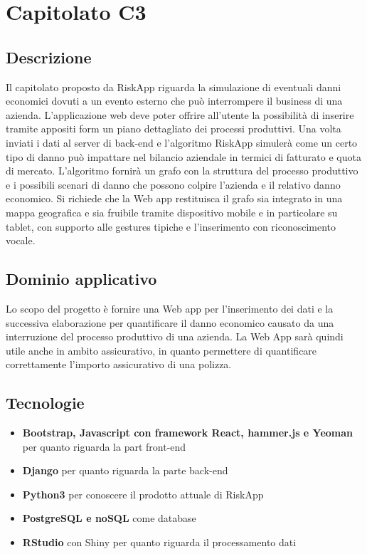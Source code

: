 \newpage
\section{Capitolato C3}

\subsection{Descrizione}

Il capitolato proposto da RiskApp riguarda la simulazione di eventuali danni economici dovuti a un evento esterno che può interrompere il business di una azienda. L’applicazione web deve poter offrire all’utente la possibilità di inserire tramite appositi form un piano dettagliato dei processi produttivi. Una volta inviati i dati al server di back-end e l'algoritmo RiskApp simulerà come un certo tipo di danno può impattare nel bilancio aziendale in termici di
fatturato e quota di mercato. L’algoritmo fornirà un grafo con la struttura del processo produttivo e i possibili scenari di danno che possono colpire l’azienda e il relativo danno economico. Si richiede che la Web app restituisca il grafo sia integrato in una mappa geografica e sia fruibile tramite dispositivo mobile e in particolare su tablet, con supporto alle gestures tipiche e l'inserimento con riconoscimento vocale.

\subsection{Dominio applicativo}

Lo scopo del progetto è fornire una Web app per l'inserimento dei dati e la successiva elaborazione per quantificare il danno economico causato da una interruzione del processo produttivo di una azienda. La Web App sarà quindi utile anche in ambito assicurativo, in quanto permettere di quantificare correttamente l'importo assicurativo di una polizza.

\subsection{Tecnologie}
\begin{itemize}
	\item \textbf{Bootstrap, Javascript con framework React, hammer.js e Yeoman}
	per quanto riguarda la part front-end
	\item \textbf{Django} per quanto riguarda la parte back-end
	\item \textbf{Python3} per conoscere il prodotto attuale di RiskApp
	\item \textbf{PostgreSQL e noSQL} come database
	\item \textbf{RStudio} con Shiny per quanto riguarda il processamento dati
\end{itemize}

